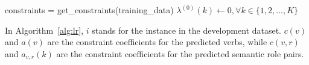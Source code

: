 
\begin{algorithm}
\SetAlgoLined
{}
constraints = get\_constraints(training\_data)\;
$\lambda^{(0)}(k) \gets 0, \forall k \in\{1, 2, ..., K\}$ \;
 \caption{Lagrangian Relaxation for Debiasing}
 \label{alg:lr}
\end{algorithm}

In Algorithm~\ref{alg:lr}, $i$ stands for the instance in the development dataset. $c(v)$ and $a(v)$ are the constraint coefficients for the predicted verbs, while $c(v,r)$ and $a_{v,r}(k)$ are the constraint coefficients for the predicted semantic role pairs. 

\fi